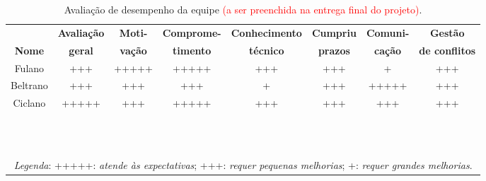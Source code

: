 \begin{landscape}
\begin{table}[htpb]
\begin{center}
\caption{Avaliação de desempenho da equipe \textcolor{red}{(a ser preenchida na entrega final do projeto)}.}
\begin{tabular}{|c|c|c|c|c|c|c|c|}
\hline
 & \textbf{Avaliação} & \textbf{Moti-} & \textbf{Comprome-} & \textbf{Conhecimento} & \textbf{Cumpriu} & \textbf{Comuni-} & \textbf{Gestão} \\
 \textbf{Nome} & \textbf{geral} & \textbf{vação} & \textbf{timento} & \textbf{técnico} & \textbf{prazos} & \textbf{cação} & \textbf{de conflitos} \\ \hline
Fulano & +++ & +++++ & +++++ & +++ & +++ & + & +++ \\ \hline
Beltrano & +++ &  +++ & +++ & + & +++ & +++++ & +++ \\ \hline
Ciclano & +++++ & +++ &  +++++ & +++ & +++ & +++ & +++  \\ \hline
  &  &  &  &  &  &  &     \\ \hline
  &  &  &  &  &  &  &     \\ \hline
  &  &  &  &  &  &  &     \\ \hline
  &  &  &  &  &  &  &     \\ \hline
  &  &  &  &  &  &  &     \\ \hline
  &  &  &  &  &  &  &     \\ \hline
  &  &  &  &  &  &  &     \\ \hline
  &  &  &  &  &  &  &     \\ \hline
  &  &  &  &  &  &  &     \\ \hline
  &  &  &  &  &  &  &     \\ \hline
  &  &  &  &  &  &  &     \\ \hline
  &  &  &  &  &  &  &     \\ \hline
\multicolumn{8}{c}{\textit{Legenda}: +++++: \textit{atende às expectativas}; +++: \textit{requer pequenas melhorias}; +: \textit{requer grandes melhorias}.} 
\end{tabular}
\end{center}
\end{table}


\end{landscape}